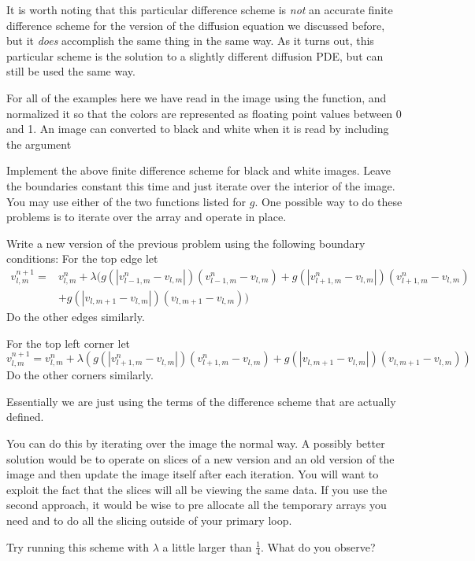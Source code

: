 It is worth noting that this particular difference scheme is \textit{not} an accurate finite difference scheme for the version of the diffusion equation we discussed before, but it \textit{does} accomplish the same thing in the same way.
As it turns out, this particular scheme is the solution to a slightly different diffusion PDE, but can still be used the same way.

For all of the examples here we have read in the image using the  function, and normalized it so that the colors are represented as floating point values between 0 and 1.
An image can converted to black and white when it is read by including the argument 

\begin{problem}
Implement the above finite difference scheme for black and white images.
Leave the boundaries constant this time and just iterate over the interior of the image.
You may use either of the two functions listed for $g$.
One possible way to do these problems is to iterate over the array and operate in place.
\end{problem}

\begin{problem}
Write a new version of the previous problem using the following boundary conditions:
For the top edge let 
\begin{equation*}
\begin{split}
v_{l,m}^{n+1} =& v_{l,m}^n + \lambda (g(|v_{l-1,m}^n - v_{l,m}|)(v_{l-1,m}^n - v_{l,m}) + g(|v_{l+1,m}^n - v_{l,m}|)(v_{l+1,m}^n - v_{l,m}) \\
 &+ g(|v_{l,m+1} - v_{l,m}|)(v_{l,m+1} - v_{l,m}))
\end{split}
\end{equation*}
Do the other edges similarly.

For the top left corner let
\begin{equation*}
v_{l,m}^{n+1} = v_{l,m}^n + \lambda (g(|v_{l+1,m}^n - v_{l,m}|)(v_{l+1,m}^n - v_{l,m}) + g(|v_{l,m+1} - v_{l,m}|)(v_{l,m+1} - v_{l,m}))
\end{equation*}
Do the other corners similarly.

Essentially we are just using the terms of the difference scheme that are actually defined.

You can do this by iterating over the image the normal way.
A possibly better solution would be to operate on slices of a new version and an old version of the image and then update the image itself after each iteration.
You will want to exploit the fact that the slices will all be viewing the same data.
If you use the second approach, it would be wise to pre allocate all the temporary arrays you need and to do all the slicing outside of your primary loop.

Try running this scheme with $\lambda$ a little larger than $\frac{1}{4}$. What do you observe?
\end{problem}

